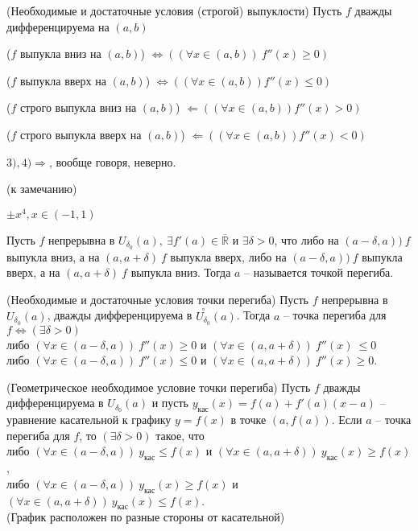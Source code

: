 \begin{multicols}{2}
    \begin{theorema}{(Необходимые и достаточные условия (строгой) выпуклости)}{}
         Пусть $f$ дважды дифференцируема на $(a,b)$ \begin{enumerate*}
            \item ($f$ выпукла вниз на $(a,b)$) $\Longleftrightarrow ((\forall x \in(a,b)) \ f''(x)\geq 0)$
            \item ($f$ выпукла вверх на $(a,b)$) $\Longleftrightarrow ((\forall x \in (a,b)) f''(x) \leq 0)$
            \item ($f$ строго выпукла вниз на $(a,b)$) $\Longleftarrow ((\forall x \in (a,b)) f''(x) > 0)$ 
            \item ($f$ строго выпукла вверх на $(a,b)$) $\Longleftarrow ((\forall x \in (a,b)) f''(x) < 0)$		
    \end{enumerate*}
    \end{theorema}
    \begin{note}{}{}
         $3), 4) \Rightarrow$, вообще говоря, неверно.
    \end{note}
    \Ex (к замечанию)
    
    $\pm x^4, x\in (-1, 1)$  
    
    \begin{definition}{}{}
         Пусть $f$ непрерывна в $U_{\delta_0}(a),\ \exists f'(a) \in\overline{\mathbb R}$ и $\exists \delta >0$, что либо на $(a-\delta, a))\ f$ выпукла вниз, а на $(a, a+\delta)\ f$ выпукла вверх, либо на $(a-\delta, a))\ f$ выпукла вверх, а на $(a, a+\delta)\ f$ выпукла вниз. Тогда $a$ -- называется точкой перегиба.
    \end{definition}
    \begin{theorema}{(Необходимые и достаточные условия точки перегиба)}{}
        Пусть $f$ непрерывна в $U_{\delta_0}(a)$, дважды дифференцируема в $\overset{\circ}{U_{\delta_0}}(a)$. Тогда $a$ -- точка перегиба для $f \Leftrightarrow (\exists \delta > 0)$ \\либо $(\forall x \in (a-\delta, a))\ f''(x)\geq 0$ и $(\forall x\in (a,a+\delta))\  f''(x)\ \leq 0$\\либо $(\forall x\in (a-\delta, a))\ f''(x) \leq 0$ и $(\forall x \in (a, a+\delta))\ f''(x) \geq 0$.
    \end{theorema}

    \begin{theorema}{(Геометрическое необходимое условие точки перегиба)}{}
        Пусть $f$ дважды дифференцируема в $U_{\delta_0}(a)$ и пусть $y_{\text{кас}}(x) = f(a) + f'(a)(x-a)$ -- уравнение касательной к графику $y = f(x)$ в точке $(a,f(a))$. Если $a$ -- точка перегиба для $f$, то $(\exists \delta > 0)$ такое, что\\либо $(\forall x \in (a-\delta, a))\ y_{\text{кас}} \leq f(x)$ и $(\forall x\in (a,a+\delta))\ y_{\text{кас}}(x)\geq f(x)$,\\либо $(\forall x\in (a-\delta, a))\ y_{\text{кас}}(x) \geq f(x)$ и $(\forall x\in (a,a+\delta))\ y_{\text{кас}}(x) \leq f(x)$.\\(График расположен по разные стороны от касательной)
    \end{theorema}


\end{multicols}
